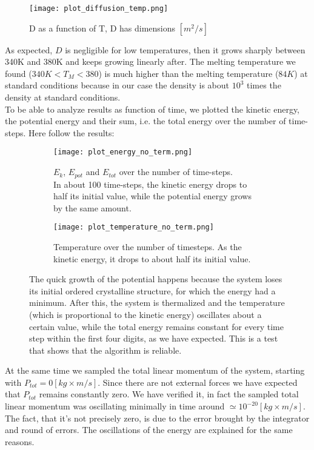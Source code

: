 \documentclass[10pt,a4paper,titlepage]{article}
\begin{document}
\begin{figure}[H]
\begin{center}
    \texttt{[image: plot\_diffusion\_temp.png]}
\caption{D as a function of T, D has dimensions $[m^2 /s]$}
\end{center}
\end{figure}
\noindent As expected, $D$ is negligible for low temperatures, then it grows sharply between 340K and 380K and keeps growing linearly after. The melting temperature we found ($340 K < T_M < 380$) is much higher than the melting temperature ($84 K$) at standard conditions because in our case the density is about $10^3$ times the density at standard conditions.
\\

\noindent To be able to analyze results as function of time, we plotted the kinetic energy, the potential energy and their sum, i.e. the total energy over the number of time-steps. Here follow the results:
\begin{center}
\begin{figure}[H]
 \centering
\begin{subfigure}{.5\textwidth}
  \centering
  \texttt{[image: plot\_energy\_no\_term.png]}
  \caption{$E_k$, $E_{pot}$ and $E_{tot}$ over the number of time-steps. \\ In about 100 time-steps, the kinetic energy drops to \\ half its initial value, while the potential energy grows \\ by the same amount.}
  \label{fig:sfig2}
\end{subfigure}%
\begin{subfigure}{.5\textwidth}
  \centering
  \texttt{[image: plot\_temperature\_no\_term.png]}
  \caption{\footnotesize Temperature over the number of timesteps. As the kinetic energy, it drops to about half its initial value.}
  \label{fig:sfig2}
\end{subfigure}%
\caption{{\footnotesize The quick growth of the potential happens because the system loses its initial ordered crystalline structure, for which the energy had a minimum. After this, the system is thermalized and the temperature (which is proportional to the kinetic energy) oscillates about a certain value, while the total energy remains constant for every time step within the first four digits, as we have expected. This is a test that shows that the algorithm is reliable.}}
\label{fig:fig}
\end{figure}
\end{center} 
\noindent At the same time we  sampled the total linear momentum of the system, starting with $P_{tot}=0 [kg \times m /s]$. Since there are not external forces we have expected that $P_{tot}$ remains constantly zero. We have verified it, in fact the sampled total linear momentum was oscillating minimally in time around  $\simeq 10^{-20} [kg \times m/s]$. 
\\
The fact, that it's not precisely zero, is due to the error brought by the integrator and round of errors. The oscillations of the energy are explained for the same reasons.
\end{document}

